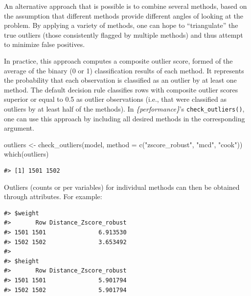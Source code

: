 \documentclass{article}
\newenvironment{Shaded}{\begin{snugshade}}{\end{snugshade}}
\newcommand{\AttributeTok}[1]{\textcolor[rgb]{0.77,0.63,0.00}{#1}}
\newcommand{\FunctionTok}[1]{\textcolor[rgb]{0.00,0.00,0.00}{#1}}
\newcommand{\NormalTok}[1]{#1}
\newcommand{\OtherTok}[1]{\textcolor[rgb]{0.56,0.35,0.01}{#1}}
\newcommand{\SpecialCharTok}[1]{\textcolor[rgb]{0.00,0.00,0.00}{#1}}
\newcommand{\StringTok}[1]{\textcolor[rgb]{0.31,0.60,0.02}{#1}}
\begin{document}
An alternative approach that is possible is to combine several methods,
based on the assumption that different methods provide different angles
of looking at the problem. By applying a variety of methods, one can
hope to ``triangulate'' the true outliers (those consistently flagged by
multiple methods) and thus attempt to minimize false positives.

In practice, this approach computes a composite outlier score, formed of
the average of the binary (0 or 1) classification results of each
method. It represents the probability that each observation is
classified as an outlier by at least one method. The default decision
rule classifies rows with composite outlier scores superior or equal to
0.5 as outlier observations (i.e., that were classified as outliers by
at least half of the methods). In \emph{\{performance\}}'s
\texttt{check\_outliers()}, one can use this approach by including all
desired methods in the corresponding argument.

\begin{Shaded}
\begin{Highlighting}[]
\NormalTok{outliers }\OtherTok{\textless{}{-}} \FunctionTok{check\_outliers}\NormalTok{(model, }\AttributeTok{method =} \FunctionTok{c}\NormalTok{(}\StringTok{"zscore\_robust"}\NormalTok{, }\StringTok{"mcd"}\NormalTok{, }\StringTok{"cook"}\NormalTok{))}
\FunctionTok{which}\NormalTok{(outliers)}
\end{Highlighting}
\end{Shaded}

\begin{verbatim}
#> [1] 1501 1502
\end{verbatim}

Outliers (counts or per variables) for individual methods can then be
obtained through attributes. For example:

\begin{Shaded}
\end{Shaded}

\begin{verbatim}
#> $weight
#>       Row Distance_Zscore_robust
#> 1501 1501               6.913530
#> 1502 1502               3.653492
#> 
#> $height
#>       Row Distance_Zscore_robust
#> 1501 1501               5.901794
#> 1502 1502               5.901794
\end{verbatim}
\end{document}
